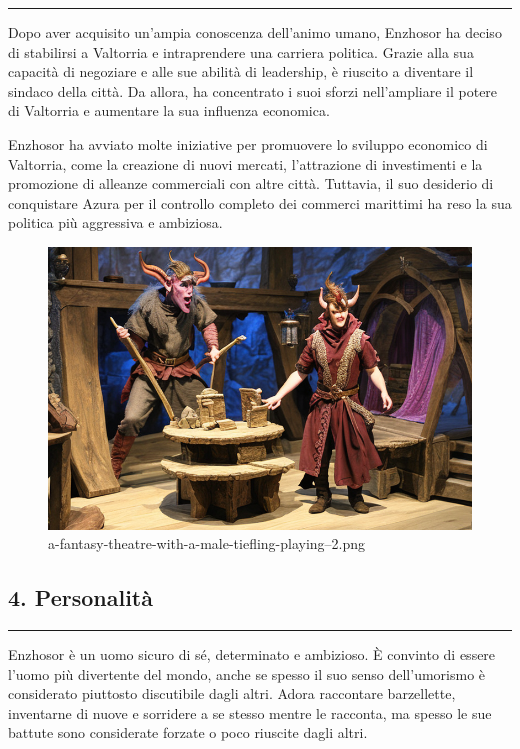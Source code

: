 \begin{center}\rule{0.5\linewidth}{0.5pt}\end{center}

Dopo aver acquisito un'ampia conoscenza dell'animo umano, Enzhosor ha
deciso di stabilirsi a Valtorria e intraprendere una carriera politica.
Grazie alla sua capacità di negoziare e alle sue abilità di leadership,
è riuscito a diventare il sindaco della città. Da allora, ha concentrato
i suoi sforzi nell'ampliare il potere di Valtorria e aumentare la sua
influenza economica.

Enzhosor ha avviato molte iniziative per promuovere lo sviluppo
economico di Valtorria, come la creazione di nuovi mercati, l'attrazione
di investimenti e la promozione di alleanze commerciali con altre città.
Tuttavia, il suo desiderio di conquistare Azura per il controllo
completo dei commerci marittimi ha reso la sua politica più aggressiva e
ambiziosa.

\begin{figure}
\centering
\includegraphics{a-fantasy-theatre-with-a-male-tiefling-playing--2.png}
\caption{a-fantasy-theatre-with-a-male-tiefling-playing--2.png}
\end{figure}

\subsection{4. Personalità}\label{personalituxe0}

\begin{center}\rule{0.5\linewidth}{0.5pt}\end{center}

Enzhosor è un uomo sicuro di sé, determinato e ambizioso. È convinto di
essere l'uomo più divertente del mondo, anche se spesso il suo senso
dell'umorismo è considerato piuttosto discutibile dagli altri. Adora
raccontare barzellette, inventarne di nuove e sorridere a se stesso
mentre le racconta, ma spesso le sue battute sono considerate forzate o
poco riuscite dagli altri.

